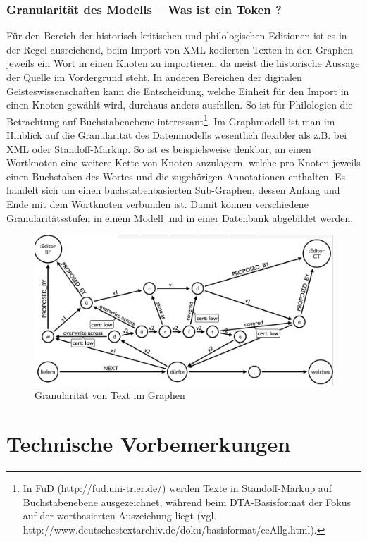 \documentclass[ngerman,]{scrreprt}
\begin{document}
\subsubsection{Granularität des Modells -- Was ist ein Token ?}\label{granularituxe4t-des-modells-was-ist-ein-token}

Für den Bereich der historisch-kritischen und philologischen Editionen ist es in der Regel ausreichend, beim Import von XML-kodierten Texten in den Graphen jeweils ein Wort in einen Knoten zu importieren, da meist die historische Aussage der Quelle im Vordergrund steht. In anderen Bereichen der digitalen Geisteswissenschaften kann die Entscheidung, welche Einheit für den Import in einen Knoten gewählt wird, durchaus anders ausfallen. So ist für Philologien die Betrachtung auf Buchstabenebene interessant\footnote{In FuD (http://fud.uni-trier.de/) werden Texte in Standoff-Markup auf Buchstabenebene ausgezeichnet, während beim DTA-Basisformat der Fokus auf der wortbasierten Auszeichung liegt (vgl. http://www.deutschestextarchiv.de/doku/basisformat/eeAllg.html).}. Im Graphmodell ist man im Hinblick auf die Granularität des Datenmodells wesentlich flexibler als z.B. bei XML oder Standoff-Markup. So ist es beispielsweise denkbar, an einen Wortknoten eine weitere Kette von Knoten anzulagern, welche pro Knoten jeweils einen Buchstaben des Wortes und die zugehörigen Annotationen enthalten. Es handelt sich um einen buchstabenbasierten Sub-Graphen, dessen Anfang und Ende mit dem Wortknoten verbunden ist. Damit können verschiedene Granularitätsstufen in einem Modell und in einer Datenbank abgebildet werden.

\begin{figure}
\centering
\includegraphics{Bilder/Granularitaet-im-Graphen.png}
\caption{Granularität von Text im Graphen}
\end{figure}

\section{Technische Vorbemerkungen}\label{technische-vorbemerkungen}
\end{document}
